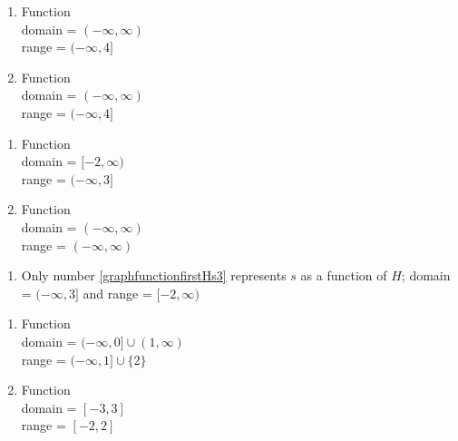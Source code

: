 \begin{multicols}{2}
\begin{enumerate}
\setcounter{enumi}{\value{HW}}

\item  Function \\ domain = $(-\infty, \infty)$ \\ range = $(-\infty, 4]$

\vfill

\columnbreak

\item  Function \\ domain = $(-\infty, \infty)$ \\ range = $(-\infty, 4]$

\setcounter{HW}{\value{enumi}}
\end{enumerate}
\end{multicols}


\begin{multicols}{2}
\begin{enumerate}
\setcounter{enumi}{\value{HW}}

\item  Function \\  domain =  $[-2, \infty)$  \\ range =   $(-\infty, 3]$

\vfill

\columnbreak

\item  Function \\ domain = $(-\infty, \infty)$ \\ range = $(-\infty, \infty)$

\setcounter{HW}{\value{enumi}}
\end{enumerate}
\end{multicols}

\begin{enumerate}
\setcounter{enumi}{\value{HW}}

\item Only number \ref{graphfunctionfirstHs3} represents $s$ as a function of $H$;  domain =  $(-\infty, 3]$  and range =   $[-2, \infty)$


\setcounter{HW}{\value{enumi}}
\end{enumerate}

\begin{multicols}{2}
\begin{enumerate}
\setcounter{enumi}{\value{HW}}

\item  Function \\  domain =  $(-\infty, 0] \cup (1, \infty)$ \\ range =  $(-\infty, 1] \cup \{ 2\}$

\vfill

\columnbreak

\item  Function \\  domain =  $[-3,3]$ \\ range =  $[-2,2]$

\setcounter{HW}{\value{enumi}}
\end{enumerate}
\end{multicols}

